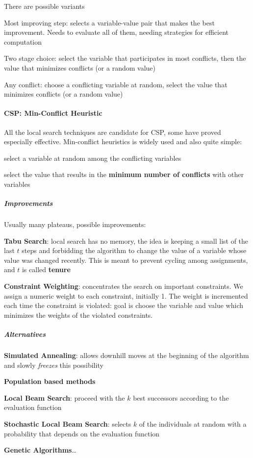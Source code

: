 \documentclass[10pt]{report}
\begin{document}
There are possible variants \begin{list}{}{}
	\item Most improving step: selects a variable-value pair that makes the best improvement. Needs to evaluate all of them, needing strategies for efficient computation
	\item Two stage choice: select the variable that participates in most conflicts, then the value that minimizes conflicts (or a random value)
	\item Any conflict: choose a conflicting variable at random, select the value that minimizes conflicts (or a random value)
\end{list}
\paragraph{CSP: Min-Conflict Heuristic} All the local search techniques are candidate for CSP, some have proved especially effective. Min-conflict heuristics is widely used and also quite simple:
\begin{list}{}{}
	\item select a variable at random among the conflicting variables
	\item select the value that results in the \textbf{minimum number of conflicts} with other variables
\end{list}
\subparagraph{Improvements} Usually many plateaus, possible improvements:
\begin{list}{}{}
	\item \textbf{Tabu Search}: local search has no memory, the idea is keeping a small list of the last $t$ steps and forbidding the algorithm to change the value of a variable whose value was changed recently. This is meant to prevent cycling among assignments, and $t$ is called \textbf{tenure}
	\item \textbf{Constraint Weighting}: concentrates the search on important constraints. We assign a numeric weight to each constraint, initially 1. The weight is incremented each time the constraint is violated: goal is choose the variable and value which minimizes the weights of the violated constraints.
\end{list}
\subparagraph{Alternatives}\begin{list}{}{}
	\item \textbf{Simulated Annealing}: allows downhill moves at the beginning of the algorithm and slowly \textit{freezes} this possibility
	\item \textbf{Population based methods}
	\begin{list}{}{}
		\item \textbf{Local Beam Search}: proceed with the $k$ best successors according to the evaluation function
		\item \textbf{Stochastic Local Beam Search}: selects $k$ of the individuals at random with a probability that depends on the evaluation function
		\item \textbf{Genetic Algorithms}\ldots
	\end{list}
\end{list}
\end{document}
